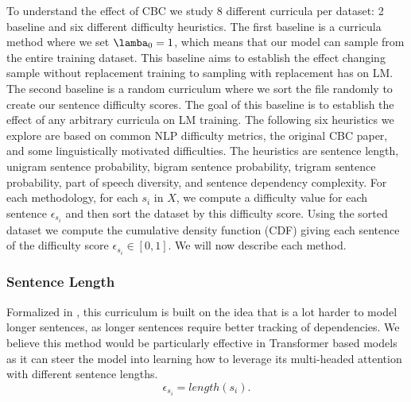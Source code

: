 To understand the effect of CBC we study 8 different curricula per dataset: 2 baseline and six different difficulty heuristics. The first baseline is a curricula method where we set $\lamba_0 = 1$, which means that our model can sample from the entire training dataset. This baseline aims to establish the effect changing sample without replacement training to sampling with replacement has on LM. The second baseline is a random curriculum where we sort the file randomly to create our sentence difficulty scores. The goal of this baseline is to establish the effect of any arbitrary curricula on LM training. The following six heuristics we explore are based on common NLP difficulty metrics, the original CBC paper, and some linguistically motivated difficulties. The heuristics are sentence length, unigram sentence probability, bigram sentence probability, trigram sentence probability, part of speech diversity, and sentence dependency complexity. For each methodology, for each $s_i$ in $X$, we compute a difficulty value for each sentence $\epsilon_{s_i}$ and then sort the dataset by this difficulty score. Using the sorted dataset we compute the cumulative density function (CDF) giving each sentence of the difficulty score $\epsilon_{s_i} \in [0,1]$. We will now describe each method.
\subsubsection{Sentence Length}
Formalized in , this curriculum is built on the idea that is a lot harder to model longer sentences, as longer sentences require better tracking of dependencies. We believe this method would be particularly effective in Transformer based models as it can steer the model into learning how to leverage its multi-headed attention with different sentence lengths. \begin{equation}
    \epsilon_{s_i} = length(s_i).
    \label{equation:sentencelen}
\end{equation} 
